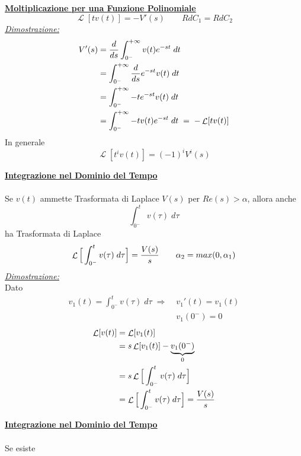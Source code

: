 \documentclass{article}
\newcommand{\Laplace}{\mathop{\mathcal{L}}}
\begin{document}
\begin{enumerate}
{				\item \underline{\textbf{Moltiplicazione per una Funzione Polinomiale}} \\
					  \[
					  	\Laplace[tv(t)] = -V'(s)\quad\quad RdC_1 = RdC_2
					  \]
					  \underline{\textit{Dimostrazione:}} \\
					  \[
					  	\begin{aligned}
							V'(s) &= {d\over{ds}} \int_{0^-}^{+\infty} {v(t) e^{-st}\; dt} \\
							&= \int_{0^-}^{+\infty} {{d\over{ds}}e^{-st} v(t)\; dt} \\
							&= \int_{0^-}^{+\infty} {-te^{-st} v(t)\; dt} \\
							&= \int_{0^-}^{+\infty} {-tv(t) e^{-st}\; dt}\; =\; -\Laplace[tv(t)]
					  	\end{aligned}
					  \]
					  In generale
					  \[
					  	\Laplace[t^i v(t)] = (-1)^i V^i(s)
					  \]
				\item \underline{\textbf{Integrazione nel Dominio del Tempo}} \\
					  \\
					  Se $ v(t) $ ammette Trasformata di Laplace $ V(s) $ per $ Re(s) > \alpha $, allora anche
					  \[
					  	\int_{0^-}^{t} {v(\tau)\; d\tau}
					  \]
					  ha Trasformata di Laplace
					  \[
					  	\Laplace\Big[\int_{0^-}^{t} {v(\tau)\; d\tau}\Big] = {V(s)\over{s}}\quad\quad \alpha_2 = max(0, \alpha_1)
					  \]
					  \underline{\textit{Dimostrazione:}} \\
					  Dato
					  \[
					  \begin{aligned}
						  v_1(t) = \int_{0^-}^{t} {v(\tau)\; d\tau}\; \Rightarrow\; &v_1'(t) = v_1(t) \\
																					&v_1(0^-) = 0
					  \end{aligned}
					  \]
					  \[
					  	\begin{aligned}
						  	\Laplace[v(t)] &= \Laplace[v_1(t)] \\
						  	&= s\Laplace[v_1(t)] - \underbrace{v_1(0^-)}_{0} \\
						  	&= s\Laplace\Big[\int_{0^-}^{t} {v(\tau)\; d\tau}\Big] \\
						  	&= \Laplace\Big[\int_{0^-}^{t} {v(\tau)\; d\tau}\Big] = {V(s)\over{s}}
					  	\end{aligned}
					  \]
				\item \underline{\textbf{Integrazione nel Dominio del Tempo}} \\
					  \\
					  Se esiste
}
\end{enumerate}
\end{document}
